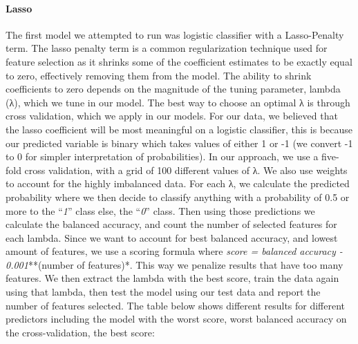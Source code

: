 \documentclass[
]{article}
\begin{document}
\paragraph{Lasso}\label{lasso}

The first model we attempted to run was logistic classifier with a
Lasso-Penalty term. The lasso penalty term is a common regularization
technique used for feature selection as it shrinks some of the
coefficient estimates to be exactly equal to zero, effectively removing
them from the model. The ability to shrink coefficients to zero depends
on the magnitude of the tuning parameter, lambda (λ), which we tune in
our model. The best way to choose an optimal λ is through cross
validation, which we apply in our models. For our data, we believed that
the lasso coefficient will be most meaningful on a logistic classifier,
this is because our predicted variable is binary which takes values of
either 1 or -1 (we convert -1 to 0 for simpler interpretation of
probabilities). In our approach, we use a five-fold cross validation,
with a grid of 100 different values of λ. We also use weights to account
for the highly imbalanced data. For each λ, we calculate the predicted
probability where we then decide to classify anything with a probability
of 0.5 or more to the ``\emph{1}'' class else, the ``\emph{0}'' class.
Then using those predictions we calculate the balanced accuracy, and
count the number of selected features for each lambda. Since we want to
account for best balanced accuracy, and lowest amount of features, we
use a scoring formula where \emph{score = balanced accuracy -
0.001}**(number of features)*. This way we penalize results that have
too many features. We then extract the lambda with the best score, train
the data again using that lambda, then test the model using our test
data and report the number of features selected. The table below shows
different results for different predictors including the model with the
worst score, worst balanced accuracy on the cross-validation, the best
score:
\end{document}
